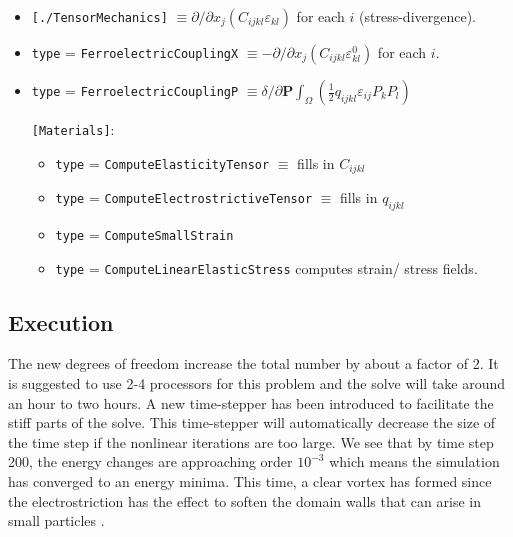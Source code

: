 \documentclass[paper=a4, fontsize=14pt]{scrartcl} %
\numberwithin{equation}{section} %
\numberwithin{figure}{section} %
\numberwithin{table}{section} %
\begin{document}
\vspace*{-5pt}

\begin{itemize}
\item \texttt{[./TensorMechanics]} $\equiv \partial /\partial x_j \left( C_{ijkl} \varepsilon_{kl}\right)$ for each $i$ (stress-divergence).
\item \texttt{type} = \texttt{FerroelectricCouplingX} $\equiv -\partial /\partial x_j \left( C_{ijkl} \varepsilon_{kl}^0\right)$ for each $i$.
\item \texttt{type} = \texttt{FerroelectricCouplingP} $\equiv \delta / \partial \textbf{P} \int_\Omega \left(\frac{1}{2} q_{ijkl} \varepsilon_{ij} P_k P_l \right)$

\texttt{[Materials]}:

\vspace*{-10pt}

\begin{itemize}

\item \texttt{type} = \texttt{ComputeElasticityTensor} $\equiv$ fills in $C_{ijkl}$

\item \texttt{type} = \texttt{ComputeElectrostrictiveTensor} $\equiv$ fills in $q_{ijkl}$

\item \texttt{type} = \texttt{ComputeSmallStrain} 
\item \texttt{type} = \texttt{ComputeLinearElasticStress} computes strain/ stress fields.

\end{itemize}

\end{itemize}

\subsection*{Execution}

The new degrees of freedom increase the total number by about a factor of 2. It is suggested to use 2-4 processors for this problem and the solve will take around an hour to two hours. A new time-stepper has been introduced to facilitate the stiff parts of the solve. This time-stepper will automatically decrease the size of the time step if the nonlinear iterations are too large. We see that by time step 200, the energy changes are approaching order $10^{-3}$ which means the simulation has converged to an energy minima. This time, a clear vortex has formed since the electrostriction has the effect to soften the domain walls that can arise in small particles \cite{Mangeri2017}.
\end{document}

